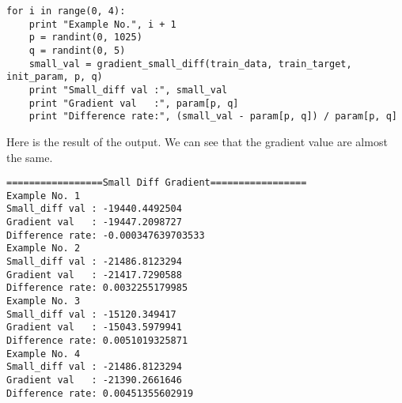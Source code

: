 \documentclass{article}
\begin{document}
\begin{part6}
\begin{verbatim}
for i in range(0, 4):
    print "Example No.", i + 1
    p = randint(0, 1025)
    q = randint(0, 5)
    small_val = gradient_small_diff(train_data, train_target, init_param, p, q)
    print "Small_diff val :", small_val
    print "Gradient val   :", param[p, q]
    print "Difference rate:", (small_val - param[p, q]) / param[p, q]
\end{verbatim}

Here is the result of the output. We can see that the gradient value are almost the same.
\begin{verbatim}
=================Small Diff Gradient=================
Example No. 1
Small_diff val : -19440.4492504
Gradient val   : -19447.2098727
Difference rate: -0.000347639703533
Example No. 2
Small_diff val : -21486.8123294
Gradient val   : -21417.7290588
Difference rate: 0.0032255179985
Example No. 3
Small_diff val : -15120.349417
Gradient val   : -15043.5979941
Difference rate: 0.0051019325871
Example No. 4
Small_diff val : -21486.8123294
Gradient val   : -21390.2661646
Difference rate: 0.00451355602919
\end{verbatim}



\end{part6}
\end{document}
